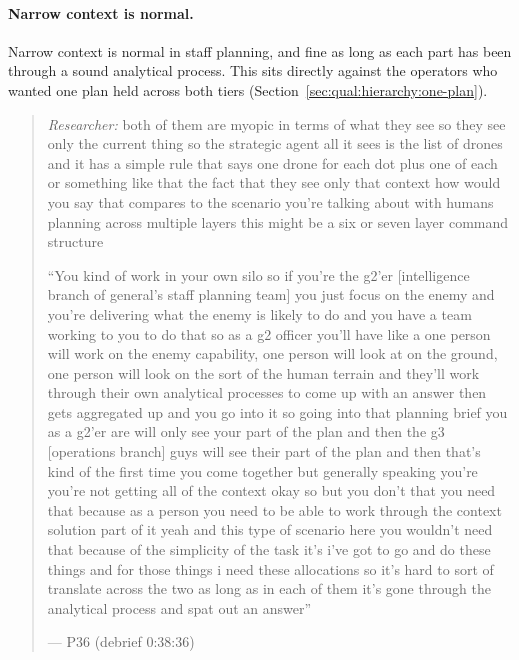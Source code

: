 
\label{sec:qual:practitioner:pt-silos}\paragraph{Narrow context is normal.}
Narrow context is normal in staff planning, and fine as long as each part has been through a sound analytical process. This sits directly against the operators who wanted one plan held across both tiers (Section~\ref{sec:qual:hierarchy:one-plan}).

\begin{quote}\small
{\footnotesize\textit{Researcher:} both of them are myopic in terms of what they see so they see only the current thing so the strategic agent all it sees is the list of drones and it has a simple rule that says one drone for each dot plus one of each or something like that the fact that they see only that context how would you say that compares to the scenario you're talking about with humans planning across multiple layers this might be a six or seven layer command structure}\par\smallskip
``You kind of work in your own silo so if you're the g2'er [intelligence branch of general's staff planning team] you just focus on the enemy and you're delivering what the enemy is likely to do and you have a team working to you to do that so as a g2 officer you'll have like a one person will work on the enemy capability, one person will look at on the ground, one person will look on the sort of the human terrain and they'll work through their own analytical processes to come up with an answer then gets aggregated up and you go into it so going into that planning brief you as a g2'er are will only see your part of the plan and then the g3 [operations branch] guys will see their part of the plan and then that's kind of the first time you come together but generally speaking you're you're not getting all of the context okay so but you don't that you need that because as a person you need to be able to work through the context solution part of it yeah and this type of scenario here you wouldn't need that because of the simplicity of the task it's i've got to go and do these things and for those things i need these allocations so it's hard to sort of translate across the two as long as in each of them it's gone through the analytical process and spat out an answer''\par\hfill--- P36 (debrief 0:38:36)
\end{quote}

